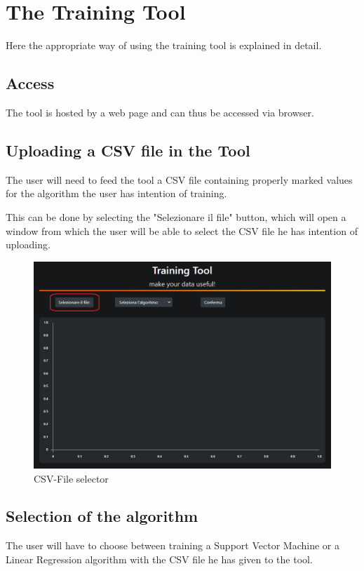 \section{The Training Tool}
Here the appropriate way of using the training tool is explained in detail.

\subsection{Access}
The tool is hosted by a web page and can thus be accessed via browser.

\subsection{Uploading a CSV file in the Tool}
The user will need to feed the tool a CSV file containing properly marked values for the algorithm the user has intention of training.

This can be done by selecting the "Selezionare il file" button, which will open a window from which the user will be able to select the CSV file he has intention of uploading.

\begin{figure}[H]
\centering
\includegraphics[scale=0.65]{img/tool/pointer_tool_1.png}
\caption{CSV-File selector}
\end{figure}
\newpage

\subsection{Selection of the algorithm}
The user will have to choose between training a Support Vector Machine or a Linear Regression algorithm with the CSV file he has given to the tool.


